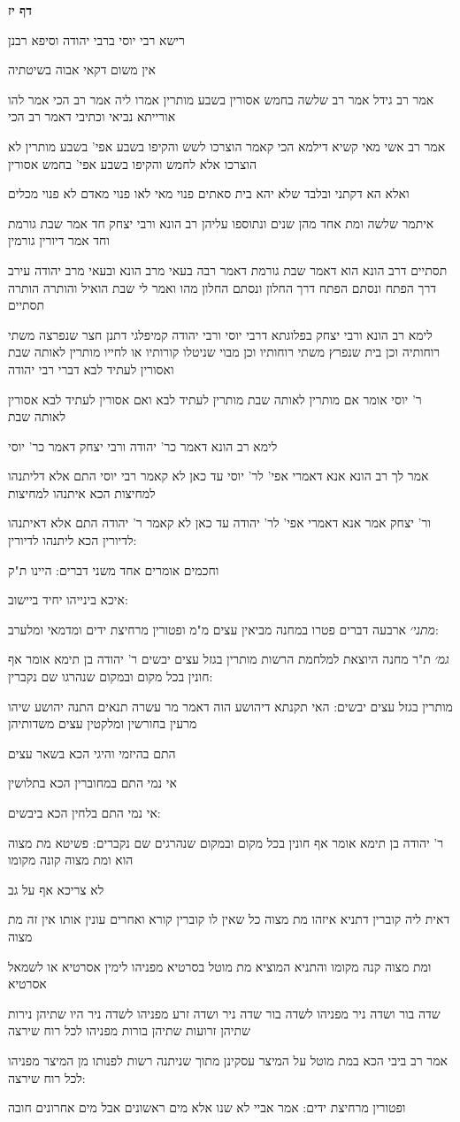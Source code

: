 \documentclass[12pt, openany]{book}
\newcommand{\sethebfont}{
\fontsize{10.5pt}{21.0pt} \selectfont
}
\newcommand{\textblock}[1]{
{\sethebfont #1\\}	
}
\newcommand{\sectname}{}
\newcommand{\newsection}[1]{
	\addcontentsline{toc}{section}{#1}
	\renewcommand{\sectname}{#1}	
	\vspace{-\baselineskip}
	\begin{center}
		\textbf{%
\fontsize{16pt}{16pt}\selectfont
			#1}
	\end{center}
	\vspace{-\baselineskip}
	\nopagebreak
}
\begin{document}
\newsection{דף יז}
\textblock{רישא רבי יוסי ברבי יהודה וסיפא רבנן}
\textblock{אין משום דקאי אבוה בשיטתיה}
\textblock{אמר רב גידל אמר רב שלשה בחמש אסורין בשבע מותרין אמרו ליה אמר רב הכי אמר להו אורייתא נביאי וכתיבי דאמר רב הכי}
\textblock{אמר רב אשי מאי קשיא דילמא הכי קאמר הוצרכו לשש והקיפו בשבע אפי' בשבע מותרין לא הוצרכו אלא לחמש והקיפו בשבע אפי' בחמש אסורין}
\textblock{ואלא הא דקתני ובלבד שלא יהא בית סאתים פנוי מאי לאו פנוי מאדם לא פנוי מכלים}
\textblock{איתמר שלשה ומת אחד מהן שנים ונתוספו עליהן רב הונא ורבי יצחק חד אמר שבת גורמת וחד אמר דיורין גורמין}
\textblock{תסתיים דרב הונא הוא דאמר שבת גורמת דאמר רבה בעאי מרב הונא ובעאי מרב יהודה עירב דרך הפתח ונסתם הפתח דרך החלון ונסתם החלון מהו ואמר לי שבת הואיל והותרה הותרה תסתיים}
\textblock{לימא רב הונא ורבי יצחק בפלוגתא דרבי יוסי ורבי יהודה קמיפלגי דתנן חצר שנפרצה משתי רוחותיה וכן בית שנפרץ משתי רוחותיו וכן מבוי שניטלו קורותיו או לחייו מותרין לאותה שבת ואסורין לעתיד לבא דברי רבי יהודה}
\textblock{ר' יוסי אומר אם מותרין לאותה שבת מותרין לעתיד לבא ואם אסורין לעתיד לבא אסורין לאותה שבת}
\textblock{לימא רב הונא דאמר כר' יהודה ורבי יצחק דאמר כר' יוסי}
\textblock{אמר לך רב הונא אנא דאמרי אפי' לר' יוסי עד כאן לא קאמר רבי יוסי התם אלא דליתנהו למחיצות הכא איתנהו למחיצות}
\textblock{ור' יצחק אמר אנא דאמרי אפי' לר' יהודה עד כאן לא קאמר ר' יהודה התם אלא דאיתנהו לדיורין הכא ליתנהו לדיורין:}
\textblock{וחכמים אומרים אחד משני דברים: היינו ת"ק}
\textblock{איכא בינייהו יחיד ביישוב:}
\textblock{{\large\emph{מתני׳}} ארבעה דברים פטרו במחנה מביאין עצים מ"מ ופטורין מרחיצת ידים ומדמאי ומלערב:}
\textblock{{\large\emph{גמ׳}} ת"ר מחנה היוצאת למלחמת הרשות מותרין בגזל עצים יבשים ר' יהודה בן תימא אומר אף חונין בכל מקום ובמקום שנהרגו שם נקברין:}
\textblock{מותרין בגזל עצים יבשים: האי תקנתא דיהושע הוה דאמר מר עשרה תנאים התנה יהושע שיהו מרעין בחורשין ומלקטין עצים משדותיהן}
\textblock{התם בהיזמי והיגי הכא בשאר עצים}
\textblock{אי נמי התם במחוברין הכא בתלושין}
\textblock{אי נמי התם בלחין הכא ביבשים:}
\textblock{ר' יהודה בן תימא אומר אף חונין בכל מקום ובמקום שנהרגים שם נקברים: פשיטא מת מצוה הוא ומת מצוה קונה מקומו}
\textblock{לא צריכא אף על גב}
\textblock{דאית ליה קוברין דתניא איזהו מת מצוה כל שאין לו קוברין קורא ואחרים עונין אותו אין זה מת מצוה}
\textblock{ומת מצוה קנה מקומו והתניא המוציא מת מוטל בסרטיא מפניהו לימין אסרטיא או לשמאל אסרטיא}
\textblock{שדה בור ושדה ניר מפניהו לשדה בור שדה ניר ושדה זרע מפניהו לשדה ניר היו שתיהן נירות שתיהן זרועות שתיהן בורות מפניהו לכל רוח שירצה}
\textblock{אמר רב ביבי הכא במת מוטל על המיצר עסקינן מתוך שניתנה רשות לפנותו מן המיצר מפניהו לכל רוח שירצה:}
\textblock{ופטורין מרחיצת ידים: אמר אביי לא שנו אלא מים ראשונים אבל מים אחרונים חובה}
\end{document}

